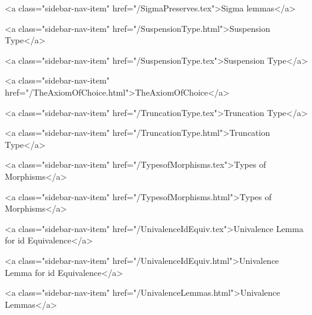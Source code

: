      
    
      
        
          <a class="sidebar-nav-item" href="/SigmaPreserves.tex">Sigma lemmas</a>
        
      
    
      
        
          <a class="sidebar-nav-item" href="/SuspensionType.html">Suspension Type</a>
        
      
    
      
        
          <a class="sidebar-nav-item" href="/SuspensionType.tex">Suspension Type</a>
        
      
    
      
        
          <a class="sidebar-nav-item" href="/TheAxiomOfChoice.html">TheAxiomOfChoice</a>
        
      
    
      
        
          <a class="sidebar-nav-item" href="/TruncationType.tex">Truncation Type</a>
        
      
    
      
        
          <a class="sidebar-nav-item" href="/TruncationType.html">Truncation Type</a>
        
      
    
      
        
          <a class="sidebar-nav-item" href="/TypesofMorphisms.tex">Types of Morphisms</a>
        
      
    
      
        
          <a class="sidebar-nav-item" href="/TypesofMorphisms.html">Types of Morphisms</a>
        
      
    
      
        
          <a class="sidebar-nav-item" href="/UnivalenceIdEquiv.tex">Univalence Lemma for id Equivalence</a>
        
      
    
      
        
          <a class="sidebar-nav-item" href="/UnivalenceIdEquiv.html">Univalence Lemma for id Equivalence</a>
        
      
    
      
        
          <a class="sidebar-nav-item" href="/UnivalenceLemmas.html">Univalence Lemmas</a>
        
